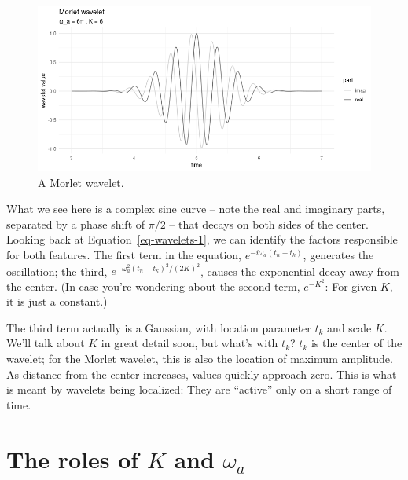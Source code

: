 \documentclass[
  letterpaper,
]{krantz}
\begin{document}
\begin{figure}[H]

{\centering \includegraphics{images/wav-morlet-example.png}

}

\caption{\label{fig-wav-morlet-example}A Morlet wavelet.}

\end{figure}

What we see here is a complex sine curve -- note the real and imaginary
parts, separated by a phase shift of \(\pi/2\) -- that decays on both
sides of the center. Looking back at Equation~\ref{eq-wavelets-1}, we
can identify the factors responsible for both features. The first term
in the equation, \(e^{-i \omega_{a} (t_n - t_k)}\), generates the
oscillation; the third, \(e^{- \omega_a^2 (t_n - t_k )^2 /(2K )^2}\),
causes the exponential decay away from the center. (In case you're
wondering about the second term, \(e^{-K^2}\): For given \(K\), it is
just a constant.)

The third term actually is a Gaussian, with location parameter \(t_k\)
and scale \(K\). We'll talk about \(K\) in great detail soon, but what's
with \(t_k\)? \(t_k\) is the center of the wavelet; for the Morlet
wavelet, this is also the location of maximum amplitude. As distance
from the center increases, values quickly approach zero. This is what is
meant by wavelets being localized: They are ``active'' only on a short
range of time.

\hypertarget{the-roles-of-k-and-omega_a}{%
\section{\texorpdfstring{The roles of
\(K\) and
\(\omega_a\)}{The roles of K and \textbackslash omega\_a}}\label{the-roles-of-k-and-omega_a}}
\end{document}
